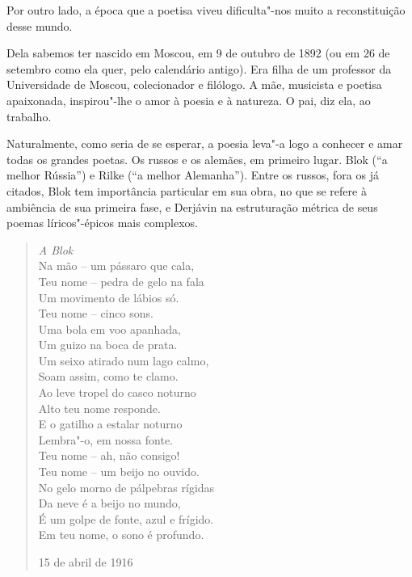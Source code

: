 Por outro lado, a época que a poetisa viveu dificulta"-nos muito a
reconstituição desse mundo.

Dela sabemos ter nascido em Moscou, em 9 de outubro de 1892 (ou em 26 de
setembro como ela quer, pelo calendário antigo). Era filha de um
professor da Universidade de Moscou, colecionador e filólogo. A mãe,
musicista e poetisa apaixonada, inspirou"-lhe o amor à poesia e à
natureza. O pai, diz ela, ao trabalho.

Naturalmente, como seria de se esperar, a poesia leva"-a logo a conhecer
e amar todas os grandes poetas. Os russos e os alemães, em primeiro
lugar. Blok (``a melhor Rússia'') e Rilke (``a melhor Alemanha''). Entre
os russos, fora os já citados, Blok tem importância particular em sua
obra, no que se refere à ambiência de sua primeira fase, e Derjávin na
estruturação métrica de seus poemas líricos"-épicos mais complexos.

\begin{verse}
\emph{A Blok} \\[8pt]
Na mão -- um pássaro que cala, \\
Teu nome -- pedra de gelo na fala \\
Um movimento de lábios só. \\[8pt]
Teu nome -- cinco sons. \\
Uma bola em voo apanhada, \\
Um guizo na boca de prata. \\
Um seixo atirado num lago calmo, \\
Soam assim, como te clamo. \\
Ao leve tropel do casco noturno \\
Alto teu nome responde. \\
E o gatilho a estalar noturno \\
Lembra"-o, em nossa fonte. \\[8pt]
Teu nome -- ah, não consigo! \\
Teu nome -- um beijo no ouvido. \\
No gelo morno de pálpebras rígidas \\
Da neve é a beijo no mundo, \\
É um golpe de fonte, azul e frígido. \\
Em teu nome, o sono é profundo. 
\begin{flushright}
15 de abril de 1916
\end{flushright}
\end{verse}

